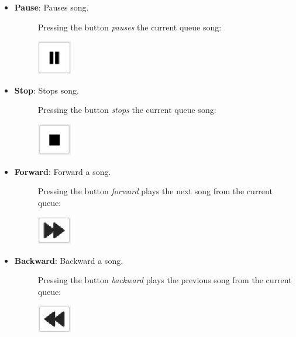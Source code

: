 \documentclass{article}
\begin{document}
\begin{itemize}
\begin{description}
    \end{description}
    \item \textbf{Pause}: Pauses song.
    \begin{description}
        \item[] Pressing the button \textit{pauses} the current queue song:
        \item[] \includegraphics[width=1.5cm]{Images/Pause.png}
    \end{description}
    \item \textbf{Stop}: Stops song.
    \begin{description}
        \item[] Pressing the button \textit{stops} the current queue song:
        \item[] \includegraphics[width=1.5cm]{Images/Stop.png}
    \end{description}
        \item \textbf{Forward}: Forward a song.
    \begin{description}
        \item[] Pressing the button \textit{forward} plays the next song from the current queue:
        \item[] \includegraphics[width=1.5cm]{Images/Forward.png}
    \end{description}
        \item \textbf{Backward}: Backward a song.
    \begin{description}
        \item[] Pressing the button \textit{backward} plays the previous song from the current queue:
        \item[] \includegraphics[width=1.5cm]{Images/Backward.png}
    \end{description}


\end{itemize}
\end{document}
